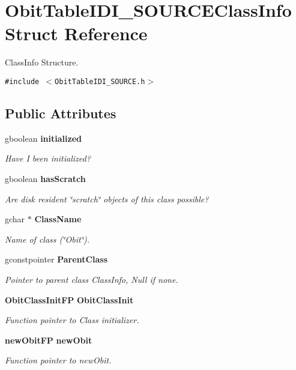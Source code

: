 \section{Obit\-Table\-IDI\_\-SOURCEClass\-Info Struct Reference}
\label{structObitTableIDI__SOURCEClassInfo}
Class\-Info Structure.  


{\tt \#include $<$Obit\-Table\-IDI\_\-SOURCE.h$>$}

\subsection*{Public Attributes}
\begin{CompactItemize}
\item 
gboolean {\bf initialized}
\begin{CompactList}\small\item\em Have I been initialized? \item\end{CompactList}\item 
gboolean {\bf has\-Scratch}
\begin{CompactList}\small\item\em Are disk resident \char`\"{}scratch\char`\"{} objects of this class possible? \item\end{CompactList}\item 
gchar $\ast$ {\bf Class\-Name}
\begin{CompactList}\small\item\em Name of class (\char`\"{}Obit\char`\"{}). \item\end{CompactList}\item 
gconstpointer {\bf Parent\-Class}
\begin{CompactList}\small\item\em Pointer to parent class Class\-Info, Null if none. \item\end{CompactList}\item 
{\bf Obit\-Class\-Init\-FP} {\bf Obit\-Class\-Init}
\begin{CompactList}\small\item\em Function pointer to Class initializer. \item\end{CompactList}\item 
{\bf new\-Obit\-FP} {\bf new\-Obit}
\begin{CompactList}\small\item\em Function pointer to new\-Obit. \item\end{CompactList}\item 

\end{CompactItemize}
